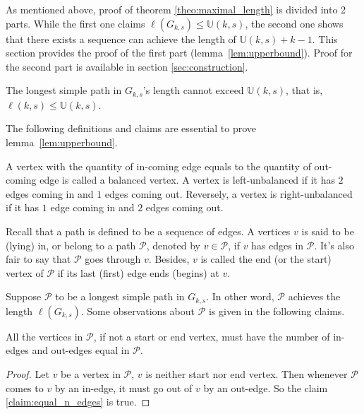 As mentioned above, proof of theorem \ref{theo:maximal_length} is divided into 2 parts. While the first one claims $\ell(G_{k,s})\leq\mathbb{U}(k,s)$, the second one shows that there exists a sequence can achieve the length of $\mathbb{U}(k,s)+k-1$. This section provides the proof of the first part (lemma~\ref{lem:upperbound}). Proof for the second part is available in section \ref{sec:construction}. 
    
\begin{lemma}\label{lem:upperbound}
    The longest simple path in $G_{k,s}$'s length cannot exceed $\mathbb{U}(k,s)$, that is, $\ell(k,s)\leq\mathbb{U}(k,s)$.
\end{lemma}
    The following definitions and claims are essential to prove lemma~\ref{lem:upperbound}.  
    
\begin{definition}
    A vertex with the quantity of in-coming edge equals to the quantity of out-coming edge is called a balanced vertex. A vertex is left-unbalanced if it has $2$ edges coming in and $1$ edges coming out. Reversely, a vertex is right-unbalanced if it has $1$ edge coming in and $2$ edges coming out.
\end{definition}


Recall that a path is defined to be a sequence of edges. A vertices $v$ is said to be (lying) in, or belong to a path $\mathcal{P}$, denoted by $v\in\mathscr{P}$, if $v$ has edges in $\mathcal{P}$. It's also fair to say that $\mathcal{P}$ goes through $v$. Besides, $v$ is called the end (or the start) vertex of $\mathcal{P}$ if its last (first) edge ends (begins) at $v$.

Suppose $\mathscr{P}$ to be a longest simple path in $G_{k,s}$. In other word, $\mathscr{P}$ achieves the length $\ell(G_{k,s})$. Some observations about $\mathscr{P}$ is given in the following claims.
\begin{claim}\label{claim:equal_n_edges}
    All the vertices in $\mathscr{P}$, if not a start or end vertex, must have the number of in-edges and out-edges equal in $\mathscr{P}$.
\end{claim}
\begin{proof}
    Let $v$ be a vertex in $\mathscr{P}$, $v$ is neither start nor end vertex. Then whenever $\mathscr{P}$ comes to $v$ by an in-edge, it must go out of $v$ by an out-edge. So the claim \ref{claim:equal_n_edges} is true.
\end{proof}

